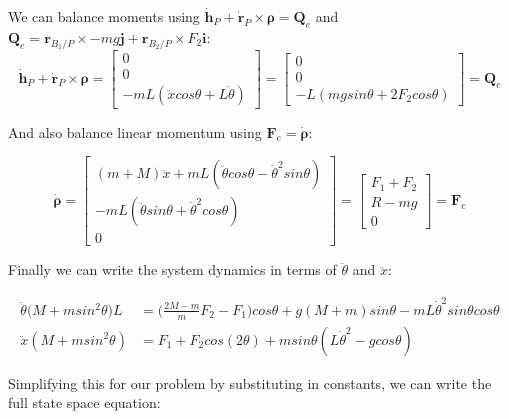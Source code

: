 \documentclass[../main.tex]{subfiles}
\begin{document}
We can balance moments using $\boldsymbol{\dot{h}}_P + \boldsymbol{\dot{r}}_P \times \boldsymbol{\rho} = \boldsymbol{Q}_{e}$ and $ \boldsymbol{Q}_{e} = \boldsymbol{r}_{B_1/P} \times -mg\boldsymbol{j} + \boldsymbol{r}_{B_2/P} \times F_2 \boldsymbol{i}$:
\begin{equation*}
\boldsymbol{\dot{h}}_P + \boldsymbol{\dot{r}}_P \times \boldsymbol{\rho} = 
\begin{bmatrix} 0 \\ 0 \\ -m L (\ddot{x} cos\theta + L\ddot{\theta}) \end{bmatrix} = \begin{bmatrix} 0 \\ 0 \\ -L(m g sin\theta + 2 F_2 cos \theta) \end{bmatrix} = \boldsymbol{Q}_e
\end{equation*}

And also balance linear momentum using $\boldsymbol{F}_e = \dot{\boldsymbol{\rho}}$:

\begin{equation*}
    \dot{\boldsymbol{\rho}} = \begin{bmatrix} (m+M)\ddot{x} + m L(\ddot{\theta}cos\theta - \dot{\theta}^2 sin\theta) \\ -m L(\ddot{\theta}sin\theta + \dot{\theta}^2 cos\theta) \\ 0 \end{bmatrix}
    = \begin{bmatrix} F_1 + F_2 \\ R-mg \\ 0 \end{bmatrix} = \boldsymbol{F}_e
\end{equation*}

Finally we can write the system dynamics in terms of $\ddot{\theta}$ and $\ddot{x}$:

\begin{align}
\ddot{\theta}\big(M+m sin^2\theta \big)L & = \bigg(\frac{2M-m}{m}F_2-F_1\bigg)cos\theta + g(M+m)sin\theta - mL\dot{\theta}^2 sin\theta cos\theta\\
\ddot{x}(M+m sin^2\theta) & = F_1 + F_2cos(2\theta)+ m sin\theta(L\dot{\theta}^2-g cos\theta)
\end{align}


Simplifying this for our problem by substituting in constants, we can write the full state space equation:
\end{document}
